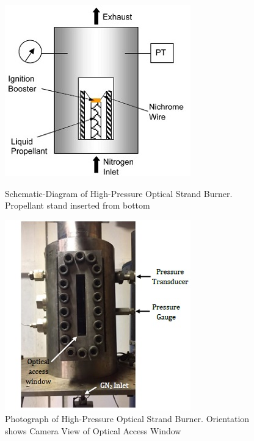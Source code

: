\documentclass{article}
\begin{document}
\begin{figure}[htb!]
\centering
\begin{minipage}{0.5\textwidth}
\centering
\includegraphics[width=0.75\linewidth]{Figure_1.jpg}
\caption{Schematic-Diagram of High-Pressure Optical Strand Burner. Propellant stand inserted from bottom}
\label{fig1}
\end{minipage}\qquad%
\begin{minipage}{0.5\textwidth}
\centering
\includegraphics[width=0.75\linewidth]{Figure_2.jpg}
\caption{Photograph of High-Pressure Optical Strand Burner. Orientation shows Camera View of Optical Access Window}
\label{fig2}
\end{minipage}
\end{figure}
\end{document}
